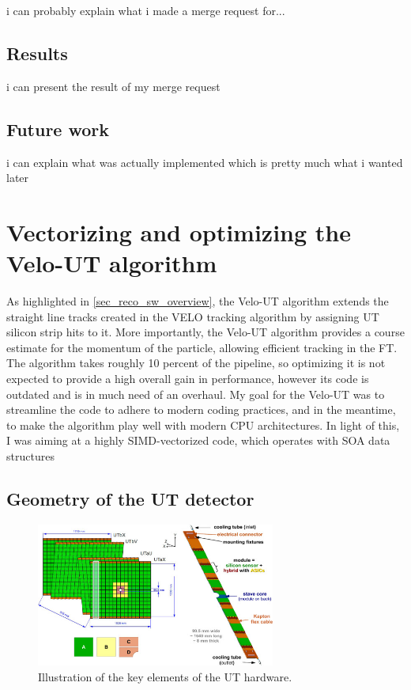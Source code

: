 \documentclass[12pt]{article}
\begin{document}
i can probably explain what i made a merge request for...

\subsection{Results}

i can present the result of my merge request

\subsection{Future work}

i can explain what was actually implemented which is pretty much what i wanted later


\newpage
\section{Vectorizing and optimizing the Velo-UT algorithm}\label{sec_opt_velout}

As highlighted in \ref{sec_reco_sw_overview}, the Velo-UT algorithm extends the straight line tracks created in the VELO tracking algorithm by assigning UT silicon strip hits to it. More importantly, the Velo-UT algorithm provides a course estimate for the momentum of the particle, allowing efficient tracking in the FT.
The algorithm takes roughly 10 percent of the pipeline, so optimizing it is not expected to provide a high overall gain in performance, however its code is outdated and is in much need of an overhaul. My goal for the Velo-UT was to streamline the code to adhere to modern coding practices, and in the meantime, to make the algorithm play well with modern CPU architectures. In light of this, I was aiming at a highly SIMD-vectorized code, which operates with SOA data structures


\subsection{Geometry of the UT detector}

\begin{figure}[H]
	\begin{center}
		\includegraphics[width=0.7\textwidth]{detector_ut_geometry}
	\end{center}
	\caption{Illustration of the key elements of the UT hardware.}
	\label{fig_ut_geometry}
\end{figure}
\end{document}
